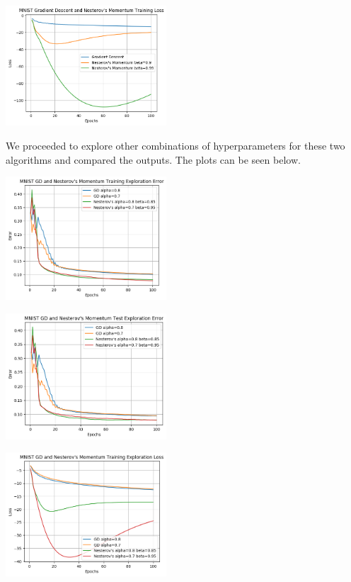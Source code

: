 \documentclass[10pt]{article}
\begin{document}
\begin{multicols}{2}
\begin{center}
\end{center}
\begin{center}
    \includegraphics[width=0.45\textwidth]{GradientDescentandNesterov'sMomentumTrainingLoss.png}
\end{center}
We proceeded to explore other combinations of hyperparameters for these two algorithms and compared the outputs. The plots can be seen below.\par
\begin{center}
    \includegraphics[width=0.45\textwidth]{GDandNesterov'sMomentumTrainingExplorationError.png}
\end{center}
\begin{center}
    \includegraphics[width=0.45\textwidth]{GDandNesterov'sMomentumTestExplorationError.png}
\end{center}
\begin{center}
    \includegraphics[width=0.45\textwidth]{GDandNesterov'sMomentumTrainingExplorationLoss.png}
\end{center}


\end{multicols}
\end{document}
